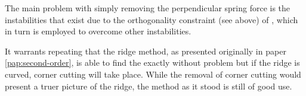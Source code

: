 

The main problem with simply removing the perpendicular spring force is the instabilities that exist due to the orthogonality constraint (see above) of , which in turn is employed to overcome other instabilities.

It warrants repeating that the ridge method, as presented originally in paper \ref{pap:second-order}, is able to find the  exactly without problem but if the ridge is curved, corner cutting will take place.
While the removal of corner cutting would present a truer picture of the ridge, the method as it stood is still of good use.

\incomplete

